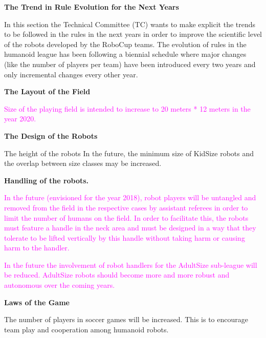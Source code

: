 \clearpage
\sffamily
{\bfseries\color[rgb]{0.4,0.4,0.4}
The Trend in Rule Evolution for the Next Years }

\bigskip

In this section the Technical Committee (TC) wants to make explicit the trends to be followed in the rules in the next years in order to improve the scientific level of the robots developed by the RoboCup teams. The evolution of rules in the humanoid league has been following
a biennial schedule where major changes (like the number of players per team) have been introduced every two years and only incremental changes every other year.

\bigskip

{\bfseries The Layout of the Field}

\headlinebox

\textcolor{magenta}{Size of the playing field is intended to increase to 20 meters * 12 meters in the year 2020.}

\bigskip

{\bfseries The Design of the Robots}

\headlinebox

The height of the robots In the future, the minimum size of KidSize robots and the overlap between size classes may be increased.

\bigskip

{\bfseries Handling of the robots.}

\headlinebox

\textcolor{magenta}{In the future (envisioned for the year 2018), robot players will be untangled and removed from the field in the respective cases by assistant referees in order to limit the number of humans on the field. In order to facilitate this, the robots must feature a handle in the neck area and must be designed in a way that they tolerate to be lifted vertically by this handle without taking harm or causing harm to the handler.}

\bigskip

\textcolor{magenta}{In the future the involvement of robot handlers for the AdultSize sub-league will be reduced. AdultSize robots should become more and more robust and autonomous over the coming years. }  

\bigskip

{\bfseries Laws of the Game}

\headlinebox

The number of players in soccer games will be increased. This is to encourage team play and cooperation among humanoid robots.

